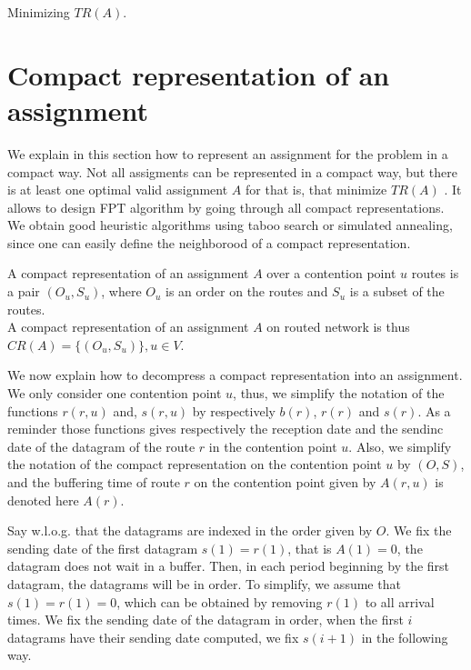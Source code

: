 \documentclass[english]{article}
\begin{document}
       Minimizing $TR(A)$.
    
    
\section{Compact representation of an assignment}





We explain in this section how to represent an assignment for the problem 
\spall in a compact way. 
Not all assigments can be represented in a compact way, but there
is at least one optimal valid assignment $A$ for \spall that is, that minimize $TR(A)$ .
It allows to design FPT algorithm by going through all compact 
representations. We obtain good heuristic algorithms using taboo search or simulated annealing, since one can easily define the neighborood of a compact representation.\\


\begin{definition}

A compact representation of an assignment $A$ over a contention point $u$ routes is a pair $(O_u,S_u)$,
where $O_u$ is an order on the routes and $S_u$ is a subset of the routes.\\
A compact representation of an assignment $A$ on routed network is thus $CR(A) = \{(O_u,S_u)\}, u\in V$.
\label{definition:compact}

\end{definition}




We now explain how to decompress a compact representation into an assignment.
We only consider one contention point $u$, thus, we simplify the notation of the functions  $r(r,u)$ and, $s(r,u)$ by respectively $b(r)$, $r(r)$ and $s(r)$.
As a reminder those functions gives respectively the reception date and the sendinc date of the datagram of the route $r$ in the contention point $u$. Also, we simplify the notation of the compact representation on the contention point $u$ by $(O,S)$, and the buffering time of route $r$ on the contention point given by $A(r,u)$ is denoted here $A(r)$.

Say w.l.o.g. that the datagrams are indexed in the order given by $O$.
We fix the sending date of the first datagram $s(1) = r(1)$, that is $A(1) = 0$, the datagram does not wait in a buffer. Then, in each period beginning by the first datagram, the datagrams will be in order. To simplify, we assume that $s(1) = r(1) = 0$, which can be obtained by removing $r(1)$ to all arrival times. We fix the sending date of the datagram in order, when the first $i$ datagrams have their sending date computed, we fix $s(i+1)$ in the following way. 
\end{document}
